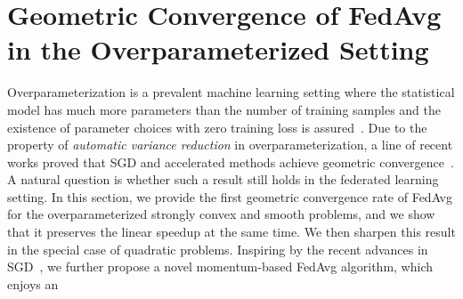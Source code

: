 


\section{Geometric Convergence of FedAvg in the Overparameterized Setting}
\label{sec:overparameterized}
Overparameterization is a prevalent machine learning setting where the
statistical model has much more parameters than the number of training samples
and the existence of parameter choices with zero training loss is
assured~\cite{allen2018convergence,zhang2016understanding}.  Due to the
property of \textit{automatic variance reduction} in overparameterization,  a
line of recent works proved that SGD and accelerated methods achieve geometric
convergence~\cite{ma2017power,moulines2011non,needell2014stochastic,schmidt2013fast,strohmer2009randomized}.
A natural question is whether such a result still holds in the federated
learning setting. 
In this section, we provide the first geometric convergence rate
of FedAvg for the overparameterized strongly convex and smooth problems,
and we show that it preserves the linear speedup at the same time.  
We then sharpen this result in the special case of
quadratic problems.
Inspiring by the recent advances in SGD~\cite{liu2019accelerating,jain2017accelerating}, 
we further propose a novel momentum-based FedAvg algorithm, which enjoys an
